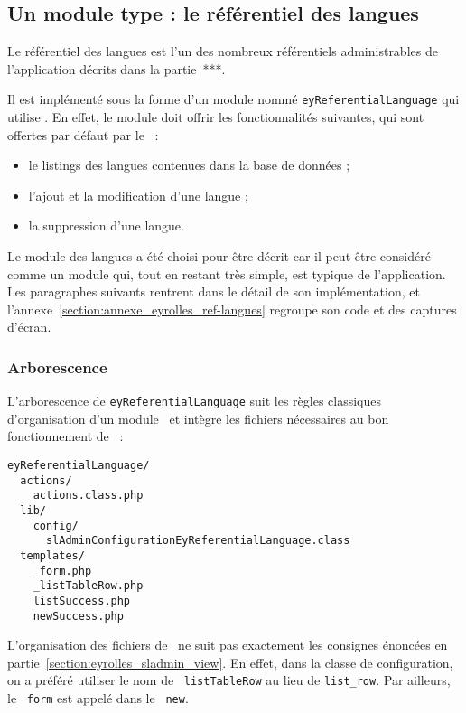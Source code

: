 \subsection{Un module type : le référentiel des langues}
\label{section:eyrolles_ref-langues}

Le référentiel des langues est l'un des nombreux référentiels administrables de l'application décrits dans la partie~***.

Il est implémenté sous la forme d'un module nommé \texttt{ey\-Referential\-Language} qui utilise \asladmin. En effet, le module doit offrir les fonctionnalités suivantes, qui sont offertes par défaut par le \aplugin\ :
\begin{itemize}
\item le listings des langues contenues dans la base de données ;
\item l'ajout et la modification d'une langue ;
\item la suppression d'une langue.
\end{itemize}

Le module des langues a été choisi pour être décrit car il peut être considéré comme un module qui, tout en restant très simple, est typique de l'application. Les paragraphes suivants rentrent dans le détail de son implémentation, et l'annexe~\ref{section:annexe_eyrolles_ref-langues} regroupe son code et des captures d'écran.


\subsubsection{Arborescence}

L'arborescence de \texttt{eyReferentialLanguage} suit les règles classiques d'organisation d'un module \asf\ et intègre les fichiers nécessaires au bon fonctionnement de \asladmin\ :

\begin{verbatim}
eyReferentialLanguage/
  actions/
    actions.class.php
  lib/
    config/
      slAdminConfigurationEyReferentialLanguage.class
  templates/
    _form.php
    _listTableRow.php
    listSuccess.php
    newSuccess.php
\end{verbatim}

L'organisation des fichiers de \atemplate\ ne suit pas exactement les consignes énoncées en partie~\ref{section:eyrolles_sladmin_view}. En effet, dans la classe de configuration, on a préféré utiliser le nom de \apartial\ \texttt{listTableRow} au lieu de \texttt{list\_row}. Par ailleurs, le \apartial\ \texttt{form} est appelé dans le \atemplate\ \texttt{new}.


